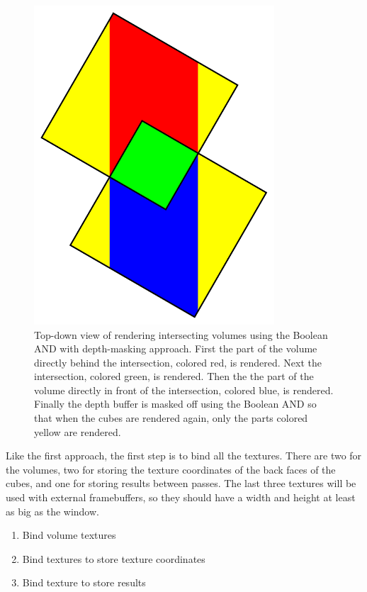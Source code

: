 \documentclass{report}
\begin{document}
\begin{figure}
\centering
\includegraphics[width=0.8\textwidth]{boolean-and.pdf}
\caption{
Top-down view of rendering intersecting volumes using the Boolean AND with
depth-masking approach.  First the part of the volume directly behind the
intersection, colored red, is rendered.  Next the intersection, colored green,
is rendered.  Then the the part of the volume directly in front of the
intersection, colored blue, is rendered.  Finally the depth buffer is masked off
using the Boolean AND so that when the cubes are rendered again, only the parts
colored yellow are rendered.
}
\label{boolean-and}
\end{figure}

Like the first approach, the first step is to bind all the textures.  There are
two for the volumes, two for storing the texture coordinates of the back faces
of the cubes, and one for storing results between passes.  The last three
textures will be used with external framebuffers, so they should have a width
and height at least as big as the window.

\begin{enumerate}
  \item Bind volume textures
  \item Bind textures to store texture coordinates
  \item Bind texture to store results
\end{enumerate}
\end{document}
